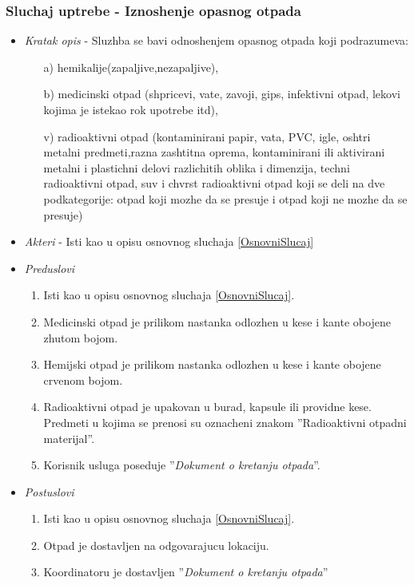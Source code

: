\documentclass[10 pt]{article}
\begin{document}
	\subsubsection{Sluchaj uptrebe - Iznoshenje opasnog otpada}
		
		\begin{itemize}
			
			\item\textit{Kratak opis} - Sluzhba se bavi odnoshenjem opasnog otpada koji podrazumeva: 
				\begin{enumerate}
					\item[a)] hemikalije(zapaljive,nezapaljive),
					\item[b)] medicinski otpad (shpricevi, vate, zavoji, gips, infektivni otpad, lekovi kojima je istekao rok upotrebe itd),
					\item[v)] radioaktivni otpad (kontaminirani papir, vata, PVC, igle, oshtri metalni predmeti,razna zashtitna oprema, kontaminirani ili aktivirani metalni i plastichni delovi razlichitih oblika i dimenzija, techni radioaktivni otpad, suv i chvrst radioaktivni otpad koji se deli na  dve  podkategorije:
						otpad  koji  mozhe da se presuje i otpad koji ne mozhe da se presuje)
				\end{enumerate}
			
			
			\item\textit{Akteri} - Isti kao u opisu osnovnog sluchaja \ref{OsnovniSlucaj}
			
			\item\textit{Preduslovi}
				\begin{enumerate}
					\item Isti kao u opisu osnovnog sluchaja \ref{OsnovniSlucaj}.
					\item Medicinski otpad je prilikom nastanka odlozhen u kese i kante obojene zhutom bojom.
					\item Hemijski otpad je prilikom nastanka odlozhen u kese i kante obojene crvenom bojom.
					\item Radioaktivni otpad je upakovan u burad, kapsule ili providne kese. Predmeti u kojima se prenosi su oznacheni znakom ''Radioaktivni otpadni materijal''.
					\item Korisnik usluga poseduje ''\textit{Dokument o kretanju otpada}''.
				\end{enumerate}
		
			\item\textit{Postuslovi}
				\begin{enumerate}
					\item Isti kao u opisu osnovnog sluchaja \ref{OsnovniSlucaj}.
					\item Otpad je dostavljen na odgovarajucu lokaciju.
					\item Koordinatoru je dostavljen ''\textit{Dokument o kretanju otpada}''
				\end{enumerate}
			

\end{itemize}
\end{document}
